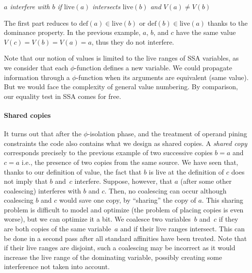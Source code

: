 \centerline{\emph{$a$ interfere with $b$ if $\textrm{live}(a)$ intersects
  $\textrm{live}(b)$ and $V(a)\neq V(b)$}}

The first part reduces to $\textrm{def}(a)\in \textrm{live}(b)$ or $\textrm{def}(b)\in \textrm{live}(a)$ thanks to the dominance property. 
In the previous example, $a$, $b$, and $c$ have the same value $V(c)=V(b)=V(a)=a$, thus they do not interfere.

Note that our notion of values is limited to the live ranges of SSA variables, as we consider that each $\phi$-function defines a new variable. 
We could propagate information through a $\phi$-function when its arguments are equivalent (same value). 
But we would face the complexity of general value numbering. 
By comparison, our equality test in SSA comes for free.

\paragraph{Shared copies}
It turns out that after the $\phi$-isolation phase, and the treatment of operand pining constraints the code also contains what we design as shared copies. 
A \emph{shared copy} corresponds precisely to the previous example of two successive copies $b=a$ and $c=a$ i.e., the presence of two copies from the same source. 
We have seen that, thanks to our definition of value, the fact that $b$ is live at the definition of $c$ does not imply that $b$ and~$c$ interfere. 
Suppose, however, that $a$ (after some other coalescing) interferes with $b$ and $c$. 
Then, no coalescing can occur although coalescing $b$ and $c$ would save one copy, by ``sharing'' the copy of $a$. 
This sharing problem is difficult to model and optimize (the problem of placing copies is even worse), but we can optimize it a bit. 
We coalesce two variables~$b$ and~$c$ if they are both copies of the same variable~$a$ and if their live ranges intersect. 
This can be done in a second pass after all standard affinities have been treated. 
Note that if their live ranges are disjoint, such a coalescing may be incorrect as it would increase the live range of the dominating variable, possibly creating some interference not taken into account.

